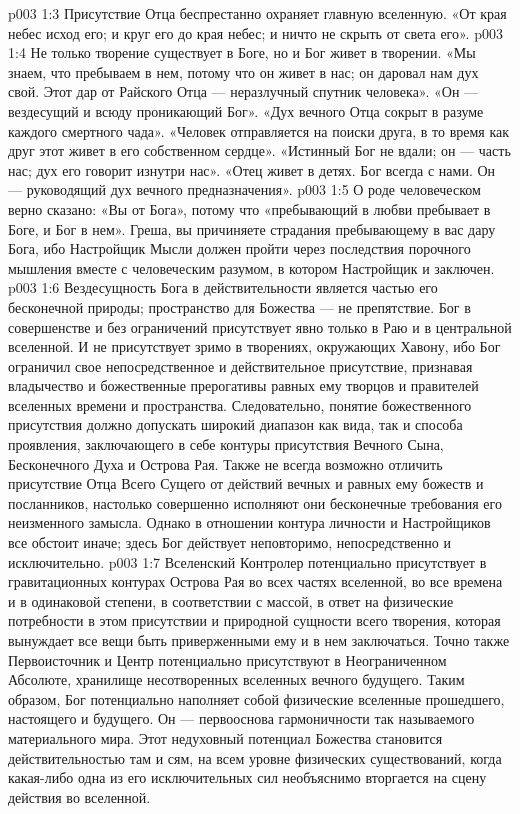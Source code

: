 \vs p003 1:3 Присутствие Отца беспрестанно охраняет главную вселенную. «От края небес исход его; и круг его до края небес; и ничто не скрыть от света его».
\vs p003 1:4 \pc Не только творение существует в Боге, но и Бог живет в творении. «Мы знаем, что пребываем в нем, потому что он живет в нас; он даровал нам дух свой. Этот дар от Райского Отца --- неразлучный спутник человека». «Он --- вездесущий и всюду проникающий Бог». «Дух вечного Отца сокрыт в разуме каждого смертного чада». «Человек отправляется на поиски друга, в то время как друг этот живет в его собственном сердце». «Истинный Бог не вдали; он --- часть нас; дух его говорит изнутри нас». «Отец живет в детях. Бог всегда с нами. Он --- руководящий дух вечного предназначения».
\vs p003 1:5 О роде человеческом верно сказано: «Вы от Бога», потому что «пребывающий в любви пребывает в Боге, и Бог в нем». Греша, вы причиняете страдания пребывающему в вас дару Бога, ибо Настройщик Мысли должен пройти через последствия порочного мышления вместе с человеческим разумом, в котором Настройщик и заключен.
\vs p003 1:6 \pc Вездесущность Бога в действительности является частью его бесконечной природы; пространство для Божества --- не препятствие. Бог в совершенстве и без ограничений присутствует явно только в Раю и в центральной вселенной. И не присутствует зримо в творениях, окружающих Хавону, ибо Бог ограничил свое непосредственное и действительное присутствие, признавая владычество и божественные прерогативы равных ему творцов и правителей вселенных времени и пространства. Следовательно, понятие божественного присутствия должно допускать широкий диапазон как вида, так и способа проявления, заключающего в себе контуры присутствия Вечного Сына, Бесконечного Духа и Острова Рая. Также не всегда возможно отличить присутствие Отца Всего Сущего от действий вечных и равных ему божеств и посланников, настолько совершенно исполняют они бесконечные требования его неизменного замысла. Однако в отношении контура личности и Настройщиков все обстоит иначе; здесь Бог действует неповторимо, непосредственно и исключительно.
\vs p003 1:7 \pc Вселенский Контролер потенциально присутствует в гравитационных контурах Острова Рая во всех частях вселенной, во все времена и в одинаковой степени, в соответствии с массой, в ответ на физические потребности в этом присутствии и природной сущности всего творения, которая вынуждает все вещи быть приверженными ему и в нем заключаться. Точно также Первоисточник и Центр потенциально присутствуют в Неограниченном Абсолюте, хранилище несотворенных вселенных вечного будущего. Таким образом, Бог потенциально наполняет собой физические вселенные прошедшего, настоящего и будущего. Он --- первооснова гармоничности так называемого материального мира. Этот недуховный потенциал Божества становится действительностью там и сям, на всем уровне физических существований, когда какая\hyp{}либо одна из его исключительных сил необъяснимо вторгается на сцену действия во вселенной.
